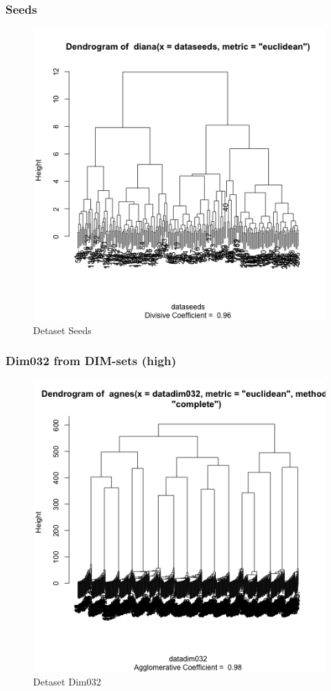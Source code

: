 \documentclass[xcolor={usenames,dvipsnames}, 
	hyperref={
	colorlinks=true, 						%
	linkcolor=black, 						%
	urlcolor=black,							%
	citecolor=black,						%
	pdfpagelabels=false,
	},
	ignorenonframetext,			%
	compress					%
]{beamer}
\begin{document}
\begin{frame}
   \frametitle{Seeds}
\begin{figure}[ht!]
\caption{Detaset Seeds}
\centering
\includegraphics[width=1\textwidth]{plots/dv2dataseeds.png}
\end{figure}
\end{frame}

\begin{frame}
   \frametitle{Dim032 from DIM-sets (high)}
\begin{figure}[ht!]
\caption{Detaset Dim032}
\centering
\includegraphics[width=1\textwidth]{plots/ang1dim032.png}
\end{figure}
\end{frame}
\end{document}
